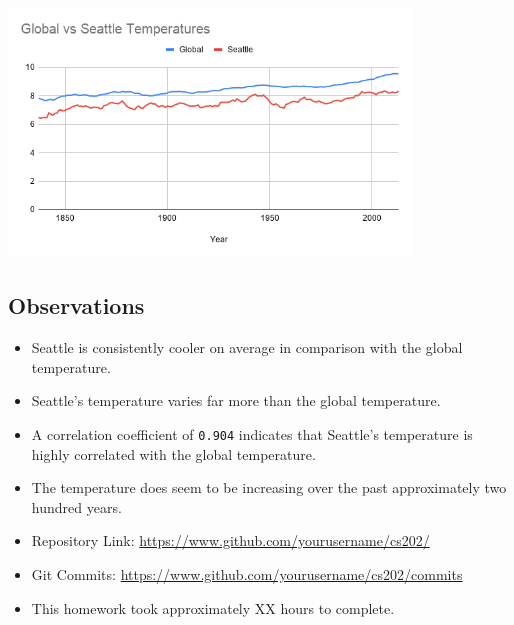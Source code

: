 \documentclass[12pt]{article}
\begin{document}
\begin{center}
\includegraphics[width=0.8\textwidth]{line_graph.png}
\end{center}

\pagebreak

\subsection{Observations}

\begin{itemize}
    \item Seattle is consistently cooler on average in comparison with the global temperature.
    \item Seattle's temperature varies far more than the global temperature.
    \item A correlation coefficient of \lstinline{0.904} indicates that Seattle's temperature is highly correlated with the global temperature.
    \item The temperature does seem to be increasing over the past approximately two hundred years.
\end{itemize}


\iffalse


\begin{itemize}
\item Repository Link:
\url{https://www.github.com/yourusername/cs202/}

\item Git Commits:
\url{https://www.github.com/yourusername/cs202/commits}


\item This homework took approximately XX hours to complete.
\end{itemize}
\end{document}
